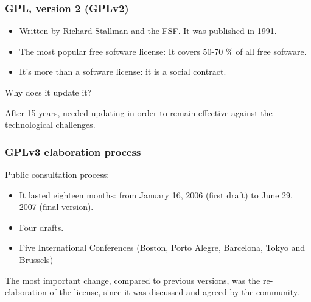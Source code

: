 
\begin{frame}
\frametitle{GPL, version 2 (GPLv2)}

\begin{itemize}
    \item Written by Richard Stallman and the FSF. It was published in 1991.
    \item The most popular free software license: It covers 50-70 \% of all free software.
    \item It's more than a software license: it is a social contract.


\end{itemize}

\pause

{\centerline{\large \alert{Why does it update it?}}}

\pause

After 15 years, needed updating in order to remain effective against the technological challenges.
\end{frame}


\begin{frame}
\frametitle{GPLv3 elaboration process}

Public consultation process:
\begin{itemize}
\item It lasted eighteen months: from January 16, 2006 (first draft) to June 29, 2007 (final version).
\item Four drafts. 
\item Five International Conferences (Boston, Porto Alegre, Barcelona, Tokyo and Brussels)
\end{itemize}

\pause

The most important change, compared to previous versions, was the re-elaboration of the license, since it was discussed and agreed by the community.
\end{frame}


